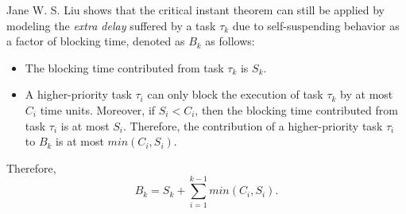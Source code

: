 Jane W. S. Liu \cite{Liu:2000:RS:518501} shows that the critical instant theorem can still be applied by modeling the \emph{extra delay} suffered by a task $\tau_k$ due to self-suspending behavior as a factor of blocking time, denoted as $B_k$ as follows:
\begin{itemize}
\item The blocking time contributed from task $\tau_k$ is $S_k$.
\item A higher-priority task $\tau_i$ can only block the execution of task $\tau_k$ by at most $C_i$ time units. Moreover, if $S_i < C_i$, then the blocking time contributed from task $\tau_i$ is at most $S_i$. Therefore, the contribution of a higher-priority task $\tau_i$  to $B_k$ is at most $min(C_i, S_i)$.
\end{itemize}
Therefore, 
\begin{equation}
\label{eq:Bk}
B_k = S_k + \sum_{i=1}^{k-1} min(C_i, S_i).
\end{equation}
  
  
  
  
  
  
